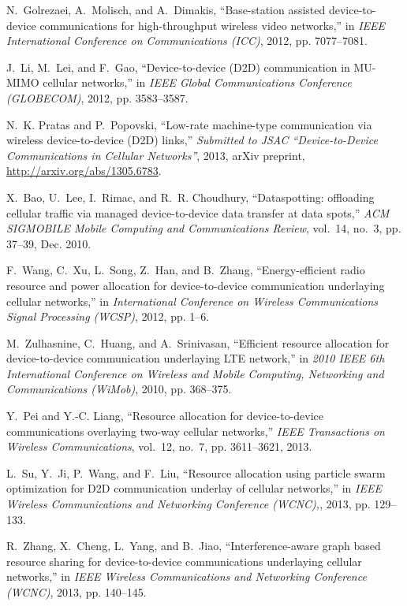 \documentclass[twocolumn,10pt]{IEEEtran}
\begin{document}
\begin{thebibliography}{10}
N.~Golrezaei, A.~Molisch, and A.~Dimakis, ``Base-station assisted
  device-to-device communications for high-throughput wireless video
  networks,'' in \emph{IEEE International Conference on Communications (ICC)},
  2012, pp. 7077--7081.

J.~Li, M.~Lei, and F.~Gao, ``{Device-to-device (D2D) communication in MU-MIMO
  cellular networks},'' in \emph{IEEE Global Communications Conference
  (GLOBECOM)}, 2012, pp. 3583--3587.

N.~K. Pratas and P.~Popovski, ``{Low-rate machine-type communication via
  wireless device-to-device (D2D) links},'' \emph{Submitted to JSAC
  ``Device-to-Device Communications in Cellular Networks''}, 2013, arXiv
  preprint, \url{http://arxiv.org/abs/1305.6783}.

X.~Bao, U.~Lee, I.~Rimac, and R.~R. Choudhury, ``Dataspotting: offloading
  cellular traffic via managed device-to-device data transfer at data spots,''
  \emph{ACM SIGMOBILE Mobile Computing and Communications Review}, vol.~14,
  no.~3, pp. 37--39, Dec. 2010.

F.~Wang, C.~Xu, L.~Song, Z.~Han, and B.~Zhang, ``Energy-efficient radio
  resource and power allocation for device-to-device communication underlaying
  cellular networks,'' in \emph{International Conference on Wireless
  Communications Signal Processing (WCSP)}, 2012, pp. 1--6.

M.~Zulhasnine, C.~Huang, and A.~Srinivasan, ``{Efficient resource allocation
  for device-to-device communication underlaying LTE network},'' in \emph{2010
  IEEE 6th International Conference on Wireless and Mobile Computing,
  Networking and Communications (WiMob)}, 2010, pp. 368--375.

Y.~Pei and Y.-C. Liang, ``{Resource allocation for device-to-device
  communications overlaying two-way cellular networks},'' \emph{IEEE
  Transactions on Wireless Communications}, vol.~12, no.~7, pp. 3611--3621,
  2013.

L.~Su, Y.~Ji, P.~Wang, and F.~Liu, ``{Resource allocation using particle swarm
  optimization for D2D communication underlay of cellular networks},'' in
  \emph{IEEE Wireless Communications and Networking Conference (WCNC),}, 2013,
  pp. 129--133.

R.~Zhang, X.~Cheng, L.~Yang, and B.~Jiao, ``Interference-aware graph based
  resource sharing for device-to-device communications underlaying cellular
  networks,'' in \emph{IEEE Wireless Communications and Networking Conference
  (WCNC)}, 2013, pp. 140--145.


\end{thebibliography}
\end{document}
